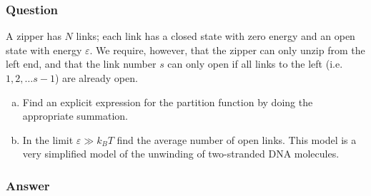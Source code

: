 \subsubsection{Question}

A zipper has $N$ links; each link has a closed state with zero energy and an
open state with energy $ε$. We require, however, that the zipper can only
unzip from the left end, and that the link number $s$ can only open if all
links to the left (i.e.\ $1, 2, \ldots s-1$) are already open.
\begin{enumerate}[a.]
    \item
        Find an explicit expression for the partition function by doing the
        appropriate summation.
    \item
        In the limit $ε≫k_B T$ find the average number of open links. This
        model is a very simplified model of the unwinding of two-stranded
        DNA molecules.
\end{enumerate}

\subsubsection{Answer}

